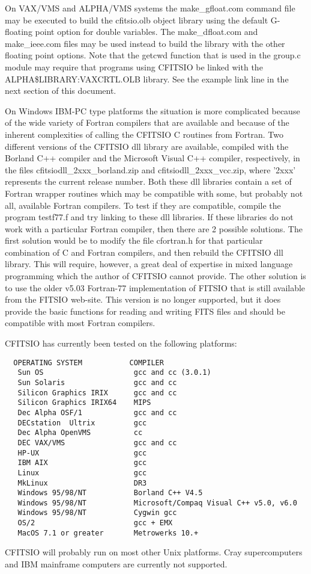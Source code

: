 \documentclass[11pt]{book}
\begin{document}
On VAX/VMS and ALPHA/VMS systems the make\_gfloat.com command file may
be executed to build the cfitsio.olb object library using the default
G-floating point option for double variables.  The make\_dfloat.com and
make\_ieee.com files may be used instead to build the library with the
other floating point options. Note that the getcwd function that is
used in the group.c module may require that programs using CFITSIO be
linked with the ALPHA\$LIBRARY:VAXCRTL.OLB library.  See the example
link line in the next section of this document.

On Windows IBM-PC type platforms the situation is more complicated
because of the wide variety of Fortran compilers that are available and
because of the inherent complexities of calling the CFITSIO C routines
from Fortran.  Two different versions of the CFITSIO dll library are
available, compiled with the Borland C++ compiler and the Microsoft
Visual C++ compiler, respectively, in the files
cfitsiodll\_2xxx\_borland.zip and cfitsiodll\_2xxx\_vcc.zip, where
'2xxx' represents the current release number.  Both these dll libraries
contain a set of Fortran wrapper routines which may be compatible with
some, but probably not all, available Fortran compilers.  To test if
they are compatible, compile the program testf77.f and try linking to
these dll libraries.  If these libraries do not work with a particular
Fortran compiler, then there are 2 possible solutions.  The first
solution would be to modify the file cfortran.h for that particular
combination of C and Fortran compilers, and then rebuild the CFITSIO
dll library.  This will require, however, a great deal of expertise in
mixed language programming which the author of CFITSIO cannot provide.
The other solution is to use the older v5.03 Fortran-77 implementation
of FITSIO that is still available from the FITSIO web-site.  This
version is no longer supported, but it does provide the basic functions
for reading and writing FITS files and should be compatible with most
Fortran compilers.

CFITSIO has currently been tested on the following platforms:

\begin{verbatim}
  OPERATING SYSTEM           COMPILER
   Sun OS                     gcc and cc (3.0.1)
   Sun Solaris                gcc and cc
   Silicon Graphics IRIX      gcc and cc
   Silicon Graphics IRIX64    MIPS
   Dec Alpha OSF/1            gcc and cc
   DECstation  Ultrix         gcc
   Dec Alpha OpenVMS          cc
   DEC VAX/VMS                gcc and cc
   HP-UX                      gcc
   IBM AIX                    gcc
   Linux                      gcc
   MkLinux                    DR3
   Windows 95/98/NT           Borland C++ V4.5
   Windows 95/98/NT           Microsoft/Compaq Visual C++ v5.0, v6.0
   Windows 95/98/NT           Cygwin gcc
   OS/2                       gcc + EMX
   MacOS 7.1 or greater       Metrowerks 10.+
\end{verbatim}
CFITSIO will probably run on most other Unix platforms.  Cray
supercomputers and IBM mainframe computers are currently not
supported.
\end{document}
